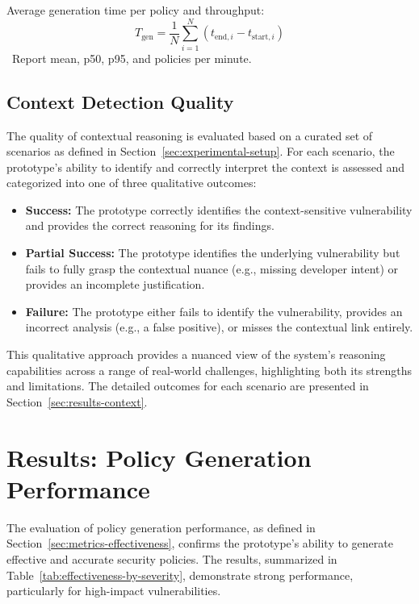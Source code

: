 Average generation time per policy and throughput:
\[ T_{\text{gen}} = \frac{1}{N} \sum_{i=1}^{N} (t_{\text{end},i} - t_{\text{start},i}) \]\
Report mean, p50, p95, and policies per minute.

\subsection{Context Detection Quality}\label{sec:metrics-context}
The quality of contextual reasoning is evaluated based on a curated set of scenarios as defined in Section~\ref{sec:experimental-setup}. For each scenario, the prototype's ability to identify and correctly interpret the context is assessed and categorized into one of three qualitative outcomes:
\begin{itemize}
    \item \textbf{Success:} The prototype correctly identifies the context-sensitive vulnerability and provides the correct reasoning for its findings.
    \item \textbf{Partial Success:} The prototype identifies the underlying vulnerability but fails to fully grasp the contextual nuance (e.g., missing developer intent) or provides an incomplete justification.
    \item \textbf{Failure:} The prototype either fails to identify the vulnerability, provides an incorrect analysis (e.g., a false positive), or misses the contextual link entirely.
\end{itemize}
This qualitative approach provides a nuanced view of the system's reasoning capabilities across a range of real-world challenges, highlighting both its strengths and limitations. The detailed outcomes for each scenario are presented in Section~\ref{sec:results-context}.

\section{Results: Policy Generation Performance}\label{sec:results-generation-performance}

The evaluation of policy generation performance, as defined in Section~\ref{sec:metrics-effectiveness}, confirms the prototype's ability to generate effective and accurate security policies. The results, summarized in Table~\ref{tab:effectiveness-by-severity}, demonstrate strong performance, particularly for high-impact vulnerabilities.

